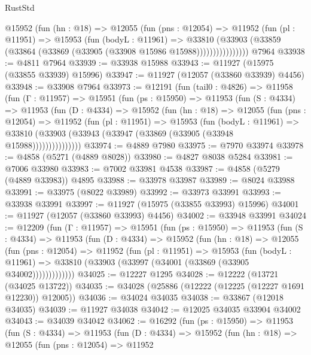 \begin{lexlean}{RustStd}
\begin{coremodule}
              @15952
                (fun (hn : @18) =>
                @12055
                  (fun (pns : @12054) =>
                  @11952
                    (fun (pl : @11951) =>
                    @15953
                      (fun (bodyL : @11961) =>
                      @33810
                        (@33903
                          (@33859 (@33864 (@33869 (@33905 (@33908 @15986 @15988))))))))))))))))
    @7964
@33938 := @4811 @7964
@33939 := @33938 @15988
@33943 := @11927 (@15975 (@33855 @33939) @15996)
@33947 := @11927 (@12057 (@33860 @33939) @4456)
@33948 := @33908 @7964
@33973 := @12191
    (fun (tail0 : @4826) =>
    @11958
      (fun (Γ : @11957) =>
      @15951
        (fun (ps : @15950) =>
        @11953
          (fun (S : @4334) =>
          @11953
            (fun (D : @4334) =>
            @15952
              (fun (hn : @18) =>
              @12055
                (fun (pns : @12054) =>
                @11952
                  (fun (pl : @11951) =>
                  @15953
                    (fun (bodyL : @11961) =>
                    @33810 (@33903 (@33943 (@33947 (@33869 (@33905 (@33948 @15988)))))))))))))))
@33974 := @4889 @7980
@33975 := @7970 @33974
@33978 := @4858 (@5271 (@4889 @8028))
@33980 := @4827 @8038 @5284
@33981 := @7006 @33980
@33983 := @7002 @33981 @4538
@33987 := @4858 (@5279 (@4889 @33983)) @4895
@33988 := @33978 @33987
@33989 := @8024 @33988
@33991 := @33975 (@8022 @33989)
@33992 := @33973 @33991
@33993 := @33938 @33991
@33997 := @11927 (@15975 (@33855 @33993) @15996)
@34001 := @11927 (@12057 (@33860 @33993) @4456)
@34002 := @33948 @33991
@34024 := @12209
    (fun (Γ : @11957) =>
    @15951
      (fun (ps : @15950) =>
      @11953
        (fun (S : @4334) =>
        @11953
          (fun (D : @4334) =>
          @15952
            (fun (hn : @18) =>
            @12055
              (fun (pns : @12054) =>
              @11952
                (fun (pl : @11951) =>
                @15953
                  (fun (bodyL : @11961) =>
                  @33810 (@33903 (@33997 (@34001 (@33869 (@33905 @34002)))))))))))))
@34025 := @12227 @1295
@34028 := @12222 (@13721 (@34025 @13722))
@34035 := @34028 (@25886 (@12222 (@12225 (@12227 @1691 @12230)) @12005))
@34036 := @34024 @34035
@34038 := @33867 (@12018 @34035)
@34039 := @11927 @34038
@34042 := @12025 @34035 @33904 @34002
@34043 := @34039 @34042
@34062 := @16292
    (fun (ps : @15950) =>
    @11953
      (fun (S : @4334) =>
      @11953
        (fun (D : @4334) =>
        @15952
          (fun (hn : @18) =>
          @12055
            (fun (pns : @12054) =>
            @11952

\end{coremodule}
\end{lexlean}
